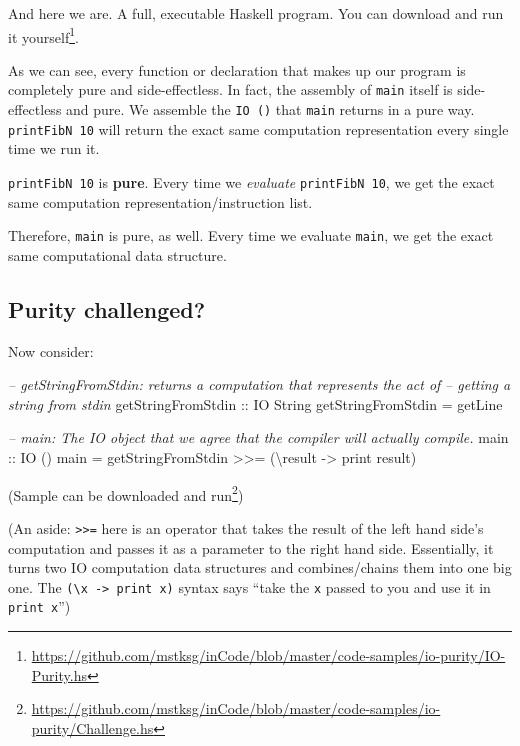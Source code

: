 \documentclass[]{article}
\newenvironment{Shaded}{}{}
\newcommand{\CommentTok}[1]{\textcolor[rgb]{0.38,0.63,0.69}{\textit{#1}}}
\newcommand{\DataTypeTok}[1]{\textcolor[rgb]{0.56,0.13,0.00}{#1}}
\newcommand{\FunctionTok}[1]{\textcolor[rgb]{0.02,0.16,0.49}{#1}}
\newcommand{\NormalTok}[1]{#1}
\newcommand{\OtherTok}[1]{\textcolor[rgb]{0.00,0.44,0.13}{#1}}
\renewcommand{\href}[2]{#2\footnote{\url{#1}}}
\begin{document}
And here we are. A full, executable Haskell program. You can
\href{https://github.com/mstksg/inCode/blob/master/code-samples/io-purity/IO-Purity.hs}{download
and run it yourself}.

As we can see, every function or declaration that makes up our program is
completely pure and side-effectless. In fact, the assembly of \texttt{main}
itself is side-effectless and pure. We assemble the \texttt{IO\ ()} that
\texttt{main} returns in a pure way. \texttt{printFibN\ 10} will return the
exact same computation representation every single time we run it.

\texttt{printFibN\ 10} is \textbf{pure}. Every time we \emph{evaluate}
\texttt{printFibN\ 10}, we get the exact same computation
representation/instruction list.

Therefore, \texttt{main} is pure, as well. Every time we evaluate \texttt{main},
we get the exact same computational data structure.

\hypertarget{purity-challenged}{%
\subsection{Purity challenged?}\label{purity-challenged}}

Now consider:

\begin{Shaded}
\begin{Highlighting}[]
\CommentTok{--  getStringFromStdin: returns a computation that represents the act of}
\CommentTok{--      getting a string from stdin}
\OtherTok{getStringFromStdin ::} \DataTypeTok{IO} \DataTypeTok{String}
\NormalTok{getStringFromStdin }\FunctionTok{=}\NormalTok{ getLine}

\CommentTok{--  main: The IO object that we agree that the compiler will actually compile.}
\OtherTok{main ::} \DataTypeTok{IO}\NormalTok{ ()}
\NormalTok{main }\FunctionTok{=}\NormalTok{ getStringFromStdin }\FunctionTok{>>=}\NormalTok{ (\textbackslash{}result }\OtherTok{->}\NormalTok{ print result)}
\end{Highlighting}
\end{Shaded}

(Sample can be
\href{https://github.com/mstksg/inCode/blob/master/code-samples/io-purity/Challenge.hs}{downloaded
and run})

(An aside: \texttt{\textgreater{}\textgreater{}=} here is an operator that takes
the result of the left hand side's computation and passes it as a parameter to
the right hand side. Essentially, it turns two IO computation data structures
and combines/chains them into one big one. The
\texttt{(\textbackslash{}x\ -\textgreater{}\ print\ x)} syntax says ``take the
\texttt{x} passed to you and use it in \texttt{print\ x}'')
\end{document}
